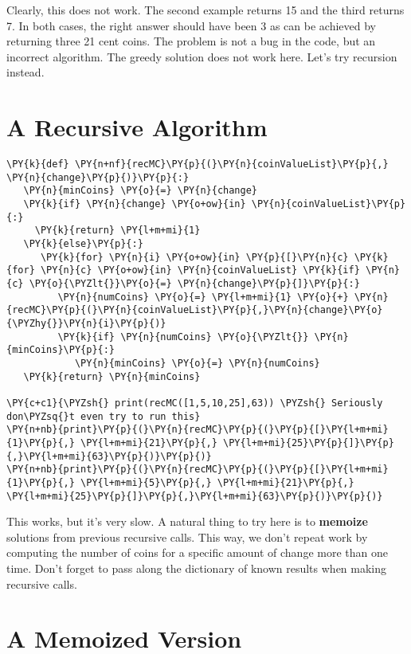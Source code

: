 Clearly, this does not work.
The second example returns 15 and the third returns 7.
In both cases, the right answer should have been 3 as can be achieved by returning three 21 cent coins.
The problem is not a bug in the code, but an incorrect algorithm.
The greedy solution does not work here.
Let's try recursion instead.

\section{A Recursive Algorithm}

\begin{Verbatim}[commandchars=\\\{\}]
\PY{k}{def} \PY{n+nf}{recMC}\PY{p}{(}\PY{n}{coinValueList}\PY{p}{,} \PY{n}{change}\PY{p}{)}\PY{p}{:}
   \PY{n}{minCoins} \PY{o}{=} \PY{n}{change}
   \PY{k}{if} \PY{n}{change} \PY{o+ow}{in} \PY{n}{coinValueList}\PY{p}{:}
     \PY{k}{return} \PY{l+m+mi}{1}
   \PY{k}{else}\PY{p}{:}
      \PY{k}{for} \PY{n}{i} \PY{o+ow}{in} \PY{p}{[}\PY{n}{c} \PY{k}{for} \PY{n}{c} \PY{o+ow}{in} \PY{n}{coinValueList} \PY{k}{if} \PY{n}{c} \PY{o}{\PYZlt{}}\PY{o}{=} \PY{n}{change}\PY{p}{]}\PY{p}{:}
         \PY{n}{numCoins} \PY{o}{=} \PY{l+m+mi}{1} \PY{o}{+} \PY{n}{recMC}\PY{p}{(}\PY{n}{coinValueList}\PY{p}{,}\PY{n}{change}\PY{o}{\PYZhy{}}\PY{n}{i}\PY{p}{)}
         \PY{k}{if} \PY{n}{numCoins} \PY{o}{\PYZlt{}} \PY{n}{minCoins}\PY{p}{:}
            \PY{n}{minCoins} \PY{o}{=} \PY{n}{numCoins}
   \PY{k}{return} \PY{n}{minCoins}

\PY{c+c1}{\PYZsh{} print(recMC([1,5,10,25],63)) \PYZsh{} Seriously don\PYZsq{}t even try to run this}
\PY{n+nb}{print}\PY{p}{(}\PY{n}{recMC}\PY{p}{(}\PY{p}{[}\PY{l+m+mi}{1}\PY{p}{,} \PY{l+m+mi}{21}\PY{p}{,} \PY{l+m+mi}{25}\PY{p}{]}\PY{p}{,}\PY{l+m+mi}{63}\PY{p}{)}\PY{p}{)}
\PY{n+nb}{print}\PY{p}{(}\PY{n}{recMC}\PY{p}{(}\PY{p}{[}\PY{l+m+mi}{1}\PY{p}{,} \PY{l+m+mi}{5}\PY{p}{,} \PY{l+m+mi}{21}\PY{p}{,} \PY{l+m+mi}{25}\PY{p}{]}\PY{p}{,}\PY{l+m+mi}{63}\PY{p}{)}\PY{p}{)}
\end{Verbatim}



This works, but it's very slow.  A natural thing to try here is to \textbf{memoize} solutions from previous recursive calls.
This way, we don't repeat work by computing the number of coins for a specific amount of change more than one time.
Don't forget to pass along the dictionary of known results when making recursive calls.

\section{A Memoized Version}

